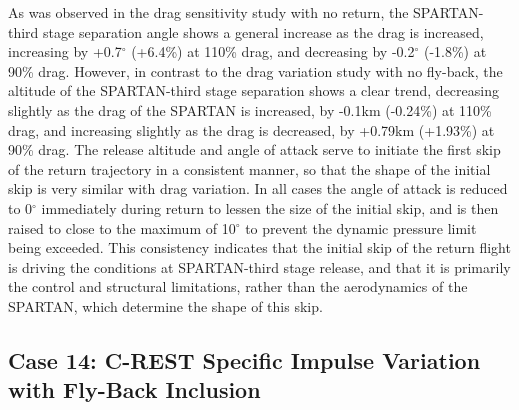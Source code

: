 As was observed in the drag sensitivity study with no return, the SPARTAN-third stage separation angle shows a general increase as the drag is increased, increasing by +0.7$^\circ$ (+6.4\%) at 110\% drag, and decreasing by -0.2$^\circ$ (-1.8\%) at 90\% drag. However, in contrast to the drag variation study with no fly-back,
the altitude of the SPARTAN-third stage separation shows a clear trend, decreasing slightly as the drag of the SPARTAN is increased, by -0.1km (-0.24\%) at 110\% drag, and increasing slightly as the drag is decreased, by +0.79km (+1.93\%) at 90\% drag.  
The release altitude and angle of attack serve to initiate the first skip of the return trajectory in a consistent manner, so that the shape of the initial skip is very similar with drag variation. In all cases the angle of attack is reduced to 0$^\circ$ immediately during return to lessen the size of the initial skip, and is then raised to close to the maximum of 10$^\circ$ to prevent the dynamic pressure limit being exceeded. This consistency indicates that the initial skip of the return flight is driving the conditions at SPARTAN-third stage release, and that it is primarily the control and structural limitations, rather than the aerodynamics of the SPARTAN, which determine the shape of this skip. 


\subsection{Case 14: C-REST Specific Impulse Variation with Fly-Back Inclusion}


